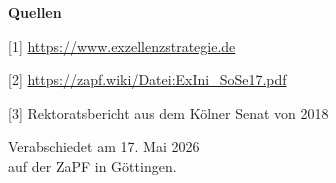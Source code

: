 \documentclass[DIV=calc]{scrartcl}
\begin{document}
\textbf{Quellen}

[1] \url{https://www.exzellenzstrategie.de}

[2] \url{https://zapf.wiki/Datei:ExIni_SoSe17.pdf}

[3] Rektoratsbericht aus dem Kölner Senat von 2018



\vspace{1cm} 
%
\vfill
\begin{flushright}
	Verabschiedet am 17. Mai 2026 \\
	auf der ZaPF in Göttingen.
\end{flushright}
\end{document}
